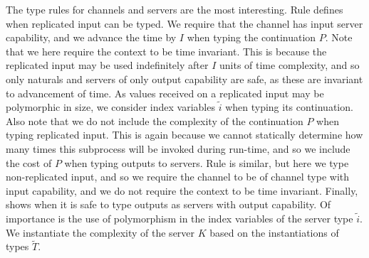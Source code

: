 The type rules for channels and servers are the most interesting. Rule  defines when replicated input can be typed. We require that the channel has input server capability, and we advance the time by $I$ when typing the continuation $P$. Note that we here require the context to be time invariant. This is because the replicated input may be used indefinitely after $I$ units of time complexity, and so only naturals and servers of only output capability are safe, as these are invariant to advancement of time. As values received on a replicated input may be polymorphic in size, we consider index variables $\widetilde{i}$ when typing its continuation. Also note that we do not include the complexity of the continuation $P$ when typing replicated input. This is again because we cannot statically determine how many times this subprocess will be invoked during run-time, and so we include the cost of $P$ when typing outputs to servers. Rule  is similar, but here we type non-replicated input, and so we require the channel to be of channel type with input capability, and we do not require the context to be time invariant. Finally,  shows when it is safe to type outputs as servers with output capability. Of importance is the use of polymorphism in the index variables of the server type $\widetilde{i}$. We instantiate the complexity of the server $K$ based on the instantiations of types $\widetilde{T}$.
%
